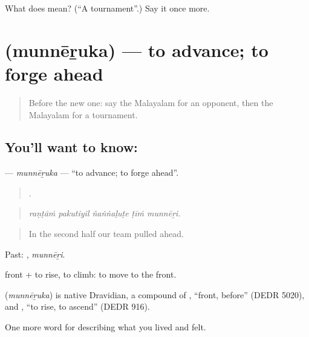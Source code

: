 \begin{tcolorbox}[breakable,colback=teal!4,colframe=teal!35!black,title={Before you move on}]
What does  mean? (\textquotedblleft{}A tournament\textquotedblright{}.) Say it once more.
\end{tcolorbox}
\section[\texorpdfstring{\ml{മുന്നേറുക} (munnēṟuka)}{മുന്നേറുക (munnēṟuka)}]{ (munnēṟuka) — to advance; to forge ahead}

\label{lesson:ML-C569-munneruka}



\begin{quote}
Before the new one: say the Malayalam for an opponent, then the Malayalam for a tournament.
\end{quote}

\subsection*{You'll want to know: }
\textbf{} — \emph{munnēṟuka} — \textquotedblleft{}to advance; to forge ahead\textquotedblright{}.

\begin{quote}
    .
\end{quote}

\begin{quote}
\emph{raṇṭāṁ pakutiyil ñaṅṅaḷuṭe ṭīṁ munnēṟi.}
\end{quote}

\begin{quote}
In the second half our team pulled ahead.
\end{quote}

Past: , \emph{munnēṟi}.

 front +  to rise, to climb: to move to the front.

\begin{cousinweb}
\textbf{} (\emph{munnēṟuka}) is native Dravidian, a compound of , \textquotedblleft{}front, before\textquotedblright{} (DEDR 5020), and , \textquotedblleft{}to rise, to ascend\textquotedblright{} (DEDR 916).
\end{cousinweb}

\begin{grammarlens}[title={What you've built}]
One more word for describing what you lived and felt.
\end{grammarlens}

